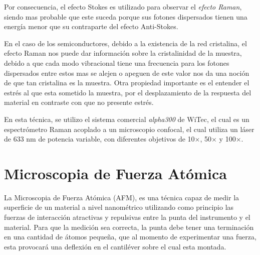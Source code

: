 Por consecuencia, el efecto Stokes es utilizado para observar el \textit{efecto Raman}, siendo mas probable que este suceda porque sus fotones dispersados tienen una energía menor que su contraparte del efecto Anti-Stokes.

En el caso de los semiconductores, debido a la existencia de la red cristalina, el efecto Raman nos puede dar información sobre la cristalinidad de la muestra, debido a que cada modo vibracional tiene una frecuencia para los fotones dispersados entre estos mas se alejen o apeguen de este valor nos da una noción de que tan cristalina es la muestra\cite{Nassar2016, Qiu2021}. Otra propiedad importante es el entender el estrés al que esta sometido la muestra, por el desplazamiento de la respuesta del material en contraste con que no presente estrés\cite{Weber2000}.

En esta técnica, se utilizo el sistema comercial \textit{alpha300} de WiTec, el cual es un espectrómetro Raman acoplado a un microscopio confocal, el cual utiliza un láser de 633 nm de potencia variable, con diferentes objetivos de 10$\times$, 50$\times$ y 100$\times$.

\section{Microscopia de Fuerza Atómica}
\label{sec:chap3-afm}
La Microscopia de Fuerza Atómica (AFM), es una técnica capaz de medir la superficie de un material a nivel nanométrico utilizando como principio las fuerzas de interacción atractivas y repulsivas entre la punta del instrumento y el material. Para que la medición sea correcta, la punta debe tener una terminación en una cantidad de átomos pequeña, que al momento de experimentar una fuerza, esta provocará una deflexión en el cantiléver sobre el cual esta 
montada\cite{Binnig1986}.


